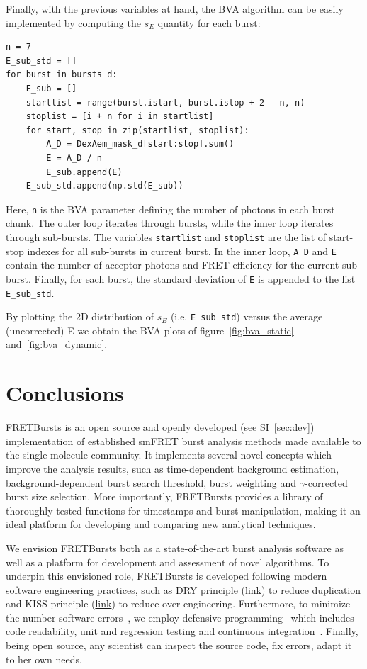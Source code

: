 \documentclass[10pt,letterpaper]{article}
\begin{document}
Finally, with the previous variables at hand, the BVA algorithm
can be easily implemented by computing the $s_E$ quantity for each burst:

\begin{lstlisting}
n = 7
E_sub_std = []
for burst in bursts_d:
    E_sub = []
    startlist = range(burst.istart, burst.istop + 2 - n, n)
    stoplist = [i + n for i in startlist]
    for start, stop in zip(startlist, stoplist): 
        A_D = DexAem_mask_d[start:stop].sum()
        E = A_D / n
        E_sub.append(E)
    E_sub_std.append(np.std(E_sub))
\end{lstlisting}

Here, \verb|n| is the BVA parameter defining the number of photons in each burst chunk. 
The outer loop iterates through bursts, while the inner loop iterates through sub-bursts.
The variables \verb|startlist| and \verb|stoplist| are the list of start-stop indexes for
all sub-bursts in current burst.
In the inner loop, \verb|A_D| and \verb|E| contain the number of acceptor photons and 
FRET efficiency for the current sub-burst. Finally, for each burst, the standard deviation 
of \verb|E| is appended to the list \verb|E_sub_std|.

By plotting the 2D distribution of $s_E$ (i.e. \verb|E_sub_std|) versus the average (uncorrected) E 
we obtain the BVA plots of figure~\ref{fig:bva_static} and~\ref{fig:bva_dynamic}.



\section{Conclusions}
\label{sec:conclusions}

FRETBursts is an open source and openly developed (see SI~\ref{sec:dev}) implementation
of established smFRET burst analysis methods
made available to the single-molecule community.
It implements several novel concepts which improve the analysis results, such as
time-dependent background estimation, background-dependent burst search threshold,
burst weighting and $\gamma$-corrected burst size selection.
More importantly, FRETBursts provides a library of thoroughly-tested functions
for timestamps and burst manipulation, making it an ideal platform for
developing and comparing new analytical techniques.

We envision FRETBursts both as a state-of-the-art burst analysis
software as well as a platform for development and assessment of novel algorithms.
To underpin this envisioned role, FRETBursts is developed following modern
software engineering practices, such as DRY principle
(\href{http://en.wikipedia.org/wiki/Don\%27t_repeat_yourself}{link})
to reduce duplication and KISS principle
(\href{http://en.wikipedia.org/wiki/KISS_principle}{link})
to reduce over-engineering. Furthermore, to minimize the number software errors~\cite{Merali_2010,Soergel_2015},
we employ defensive programming~\cite{Prli__2012} which includes code readability,
unit and regression testing and continuous integration~\cite{Eglen_2016}.
Finally, being open source, any scientist can inspect the source code,
fix errors, adapt it to her own needs.
\end{document}
